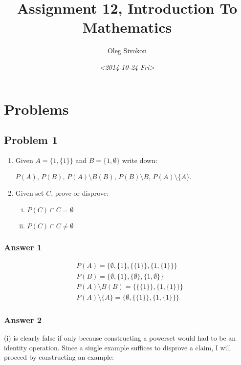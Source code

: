 \documentclass[11pt]{article}
\author{Oleg Sivokon}
\date{\textit{<2014-10-24 Fri>}}
\title{Assignment 12, Introduction To Mathematics}
\begin{document}
\maketitle
\tableofcontents


\clearpage

\section{Problems}
\label{sec-1}

\subsection{Problem 1}
\label{sec-1-1}

\begin{enumerate}
\item Given $A = \{1, \{1\}\}$ and $B = \{1, \emptyset\}$ write down:

$P(A)$, $P(B)$, $P(A) \setminus B(B)$, $P(B) \setminus B$, $P(A) \setminus \{A\}$.
\item Given set $C$, prove or disprove:
\begin{enumerate}[(i)]
\item $P(C) \cap C = \emptyset$
\item $P(C) \cap C \neq \emptyset$
\end{enumerate}
\end{enumerate}

\subsubsection{Answer 1}
\label{sec-1-1-1}

\begin{equation}
\begin{split}
& P(A) = \{\emptyset, \{1\}, \{\{1\}\}, \{1, \{1\}\}\} \\
& P(B) = \{\emptyset, \{1\}, \{\emptyset\}, \{1, \emptyset\}\} \\
& P(A) \setminus B(B) = \{\{\{1\}\}, \{1, \{1\}\}\} \\
& P(A) \setminus \{A\} = \{\emptyset,  \{\{1\}\}, \{1, \{1\}\} \}
\end{split}
\end{equation}
\subsubsection{Answer 2}
\label{sec-1-1-2}
(i) is clearly false if only because constructing a powerset would had to be
an identity operation.  Since a single example suffices to disprove a claim,
I will proceed by constructing an example:
\end{document}
